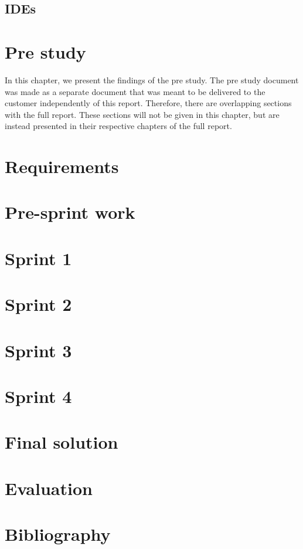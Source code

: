 \documentclass[11pt,a4paper,titlepage,oneside]{report}
\begin{document}
\section{IDEs}

\chapter{Pre study}
In this chapter, we present the findings of the pre study. The pre study document was made as a separate document that was meant to be delivered to the customer independently of this report. Therefore, there are overlapping sections with the full report. These sections will not be given in this chapter, but are instead presented in their respective chapters of the full report. 

\chapter{Requirements}

\chapter {Pre-sprint work}

\chapter{Sprint 1}

\chapter{Sprint 2}

\chapter{Sprint 3}

\chapter{Sprint 4}

\chapter{Final solution}

\chapter{Evaluation}


%

\chapter{Bibliography}
\begin{flushleft}
	
\end{flushleft}

\appendix
\end{document}
